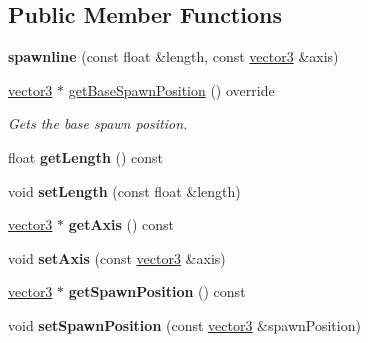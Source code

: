 \subsection*{Public Member Functions}
\begin{DoxyCompactItemize}
\item 
\mbox{\label{classflounder_1_1spawnline_aa879bdacc83e11629ce446f135343cc4}} 
{\bfseries spawnline} (const float \&length, const \hyperlink{classflounder_1_1vector3}{vector3} \&axis)
\item 
\hyperlink{classflounder_1_1vector3}{vector3} $\ast$ \hyperlink{classflounder_1_1spawnline_a264fd2342ff51355bfd5e3fa2235bc9b}{get\+Base\+Spawn\+Position} () override
\begin{DoxyCompactList}\small\item\em Gets the base spawn position. \end{DoxyCompactList}\item 
\mbox{\label{classflounder_1_1spawnline_a538047a4cc261caf8efac094b941653a}} 
float {\bfseries get\+Length} () const
\item 
\mbox{\label{classflounder_1_1spawnline_a7668b8cd4112fb19c495366a5f1820ea}} 
void {\bfseries set\+Length} (const float \&length)
\item 
\mbox{\label{classflounder_1_1spawnline_a152f55407efd62072b647ae46650ee02}} 
\hyperlink{classflounder_1_1vector3}{vector3} $\ast$ {\bfseries get\+Axis} () const
\item 
\mbox{\label{classflounder_1_1spawnline_aaa77f6205c63b52e922e4a94639ea6fa}} 
void {\bfseries set\+Axis} (const \hyperlink{classflounder_1_1vector3}{vector3} \&axis)
\item 
\mbox{\label{classflounder_1_1spawnline_a3445f45b41ebabdebfd0565eeeef5031}} 
\hyperlink{classflounder_1_1vector3}{vector3} $\ast$ {\bfseries get\+Spawn\+Position} () const
\item 
\mbox{\label{classflounder_1_1spawnline_ad6e96ee2ed15822faedc861b4bf7e7fa}} 
void {\bfseries set\+Spawn\+Position} (const \hyperlink{classflounder_1_1vector3}{vector3} \&spawn\+Position)
\end{DoxyCompactItemize}
